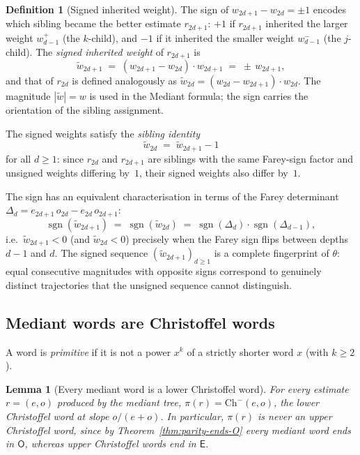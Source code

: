 \documentclass[12pt]{article}
\newtheorem{lemma}[theorem]{Lemma}
\theoremstyle{definition}
\newtheorem{definition}[theorem]{Definition}
\theoremstyle{remark}
\theoremstyle{plain}
\newcommand{\OO}{\mathsf{O}}
\newcommand{\EE}{\mathsf{E}}
\begin{document}
\begin{definition}[Signed inherited weight]
\label{def:signed-inherited-weight}
The sign of $w_{2d+1} - w_{2d} = \pm 1$ encodes which sibling became the better
estimate $r_{2d+1}$: $+1$ if $r_{2d+1}$ inherited the larger weight $w^+_{d-1}$
(the $k$-child), and $-1$ if it inherited the smaller weight $w^-_{d-1}$
(the $j$-child).
The \emph{signed inherited weight} of $r_{2d+1}$ is
\[
  \widetilde{w}_{2d+1} \;=\; (w_{2d+1} - w_{2d}) \cdot w_{2d+1} \;=\; \pm\, w_{2d+1},
\]
and that of $r_{2d}$ is defined analogously as $\widetilde{w}_{2d} = (w_{2d} - w_{2d+1}) \cdot w_{2d}$.
The magnitude $|\widetilde{w}| = w$ is used in the Mediant formula; the sign carries
the orientation of the sibling assignment.

The signed weights satisfy the \emph{sibling identity}
\[
  \widetilde{w}_{2d} \;=\; \widetilde{w}_{2d+1} - 1
\]
for all $d \geq 1$: since $r_{2d}$ and $r_{2d+1}$ are siblings with the same
Farey-sign factor and unsigned weights differing by~$1$, their signed weights
also differ by~$1$.

The sign has an equivalent characterisation in terms of the Farey determinant
$\Delta_d = e_{2d+1}\,o_{2d} - e_{2d}\,o_{2d+1}$:
\[
  \operatorname{sgn}(\widetilde{w}_{2d+1})
  \;=\; \operatorname{sgn}(\widetilde{w}_{2d})
  \;=\; \operatorname{sgn}(\Delta_d)\cdot\operatorname{sgn}(\Delta_{d-1}),
\]
i.e.\ $\widetilde{w}_{2d+1} < 0$ (and $\widetilde{w}_{2d} < 0$) precisely when
the Farey sign flips between depths $d-1$ and $d$.
The signed sequence $(\widetilde{w}_{2d+1})_{d \geq 1}$ is a complete fingerprint
of $\theta$: equal consecutive magnitudes with opposite signs correspond to
genuinely distinct trajectories that the unsigned sequence cannot distinguish.
\end{definition}

\subsection{Mediant words are Christoffel words}
\label{sec:parity-standard}

A word is \emph{primitive} if it is not a power $x^k$ of a strictly shorter word $x$
(with $k \geq 2$).

\begin{lemma}[Every mediant word is a lower Christoffel word]
\label{lem:branch-standard-pair}
For every estimate $r = (e, o)$ produced by the mediant tree,
$\pi(r) = \mathrm{Ch}^-(e, o)$, the lower Christoffel word at slope $o/(e+o)$.
In particular, $\pi(r)$ is never an upper Christoffel word, since by
Theorem~\ref{thm:parity-ends-O} every mediant word ends in $\OO$, whereas upper
Christoffel words end in $\EE$.
\end{lemma}
\end{document}
